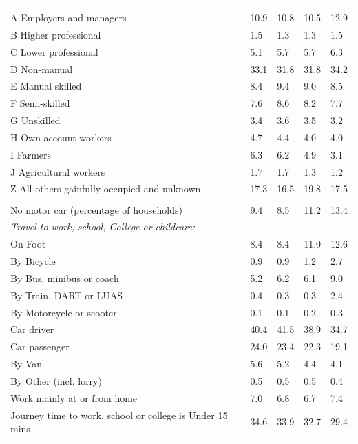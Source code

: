 \documentclass{article}
\begin{document}
\begin{table}[h]
\begin{tabular}{KTTTT}
\hline
    \\ 
    \hline
A Employers and managers & 10.9& 10.8& 10.5& 12.9\\
B Higher professional & 1.5& 1.3& 1.3& 1.5\\
C Lower professional & 5.1& 5.7& 5.7& 6.3\\
D Non-manual & 33.1& 31.8& 31.8& 34.2\\
E Manual skilled & 8.4& 9.4& 9.0& 8.5\\
F Semi-skilled & 7.6& 8.6& 8.2& 7.7\\
G Unskilled & 3.4& 3.6& 3.5& 3.2\\
H Own account workers & 4.7& 4.4& 4.0& 4.0\\
I Farmers & 6.3& 6.2& 4.9& 3.1\\
J Agricultural workers & 1.7& 1.7& 1.3& 1.2\\
Z All others gainfully occupied and unknown & 17.3& 16.5& 19.8& 17.5\\
\hline
{}\hline
    \\ 
    \hline
No motor car (percentage of households) &  9.4&  8.5& 11.2& 
13.4\\
    \hline 
\emph{Travel to work, school, College or childcare:} & & & \\
\quad On Foot &  8.4&  8.4& 11.0& 12.6\\ 
\quad By Bicycle & 0.9& 0.9& 1.2& 2.7\\ 
\quad By Bus, minibus or coach & 5.2& 6.2& 6.1& 9.0\\
\quad By Train, DART or LUAS & 0.4& 0.3& 0.3& 2.4\\
\quad By Motorcycle or scooter & 0.1& 0.1& 0.2& 0.3\\
\quad Car driver & 40.4 & 41.5& 38.9& 34.7\\
\quad Car passenger & 24.0& 23.4& 22.3& 19.1\\
\quad By Van & 5.6& 5.2& 4.4& 4.1\\
\quad By Other (incl. lorry) & 0.5& 0.5& 0.5& 0.4\\
    \hline
Work mainly at or from home & 7.0& 6.8& 6.7& 7.4\\
Journey time to work, school or college is Under 15 mins & 34.6& 33.9& 32.7& 29.4\\

\end{tabular}
\end{table}
\end{document}
